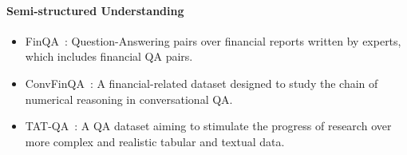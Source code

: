

\paragraph{Semi-structured Understanding}

\begin{itemize}
    \item FinQA~\citep{chen2021finqa}: Question-Answering pairs over financial reports written by experts, which includes financial QA pairs.
    \item ConvFinQA~\citep{chen2022convfinqa}: A financial-related dataset designed to study the chain of numerical reasoning in conversational QA.
    \item TAT-QA~\citep{zhu2021tatqa}: A QA dataset aiming to stimulate the progress of research over more complex and realistic tabular and textual data.
\end{itemize}



